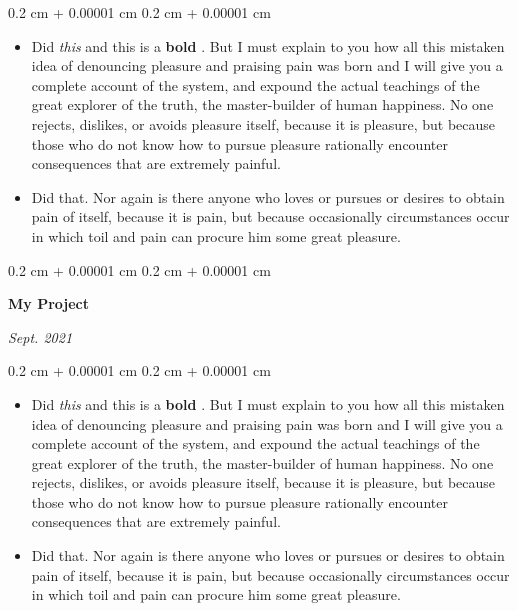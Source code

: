 \documentclass[10pt, letterpaper]{article}
\newenvironment{highlights}{
    \begin{itemize}[
        topsep=0.10 cm,
        parsep=0.10 cm,
        partopsep=0pt,
        itemsep=0pt,
        leftmargin=0.4 cm + 10pt
    ]
}{
    \end{itemize}
} %
\newenvironment{onecolentry}{
    \begin{adjustwidth}{
        0.2 cm + 0.00001 cm
    }{
        0.2 cm + 0.00001 cm
    }
}{
    \end{adjustwidth}
} %
\newenvironment{twocolentry}[2][]{
    \onecolentry
    \def\secondColumn{#2}
    \setcolumnwidth{\fill, 4.5 cm}
    \begin{paracol}{2}
}{
    \switchcolumn \raggedleft \secondColumn
    \end{paracol}
    \endonecolentry
} %
\let\hrefWithoutArrow\href
\renewcommand{\href}[2]{\hrefWithoutArrow{#1}{\mbox{\ifthenelse{\equal{#2}{}}{ }{#2 }\raisebox{.15ex}{\footnotesize \faExternalLink*}}}}
\begin{document}
        \vspace{0.10 cm-3px}
        \begin{onecolentry}
            \begin{highlights}
                \item Did \textit{this} and this is a \textbf{bold} \href{https://example.com}{link}. But I must explain to you how all this mistaken idea of denouncing pleasure and praising pain was born and I will give you a complete account of the system, and expound the actual teachings of the great explorer of the truth, the master-builder of human happiness. No one rejects, dislikes, or avoids pleasure itself, because it is pleasure, but because those who do not know how to pursue pleasure rationally encounter consequences that are extremely painful.
                \item Did that. Nor again is there anyone who loves or pursues or desires to obtain pain of itself, because it is pain, but because occasionally circumstances occur in which toil and pain can procure him some great pleasure.
            \end{highlights}
        \end{onecolentry}


        \vspace{0.2 cm-3px}

        \begin{twocolentry}{
            
            
        \textit{Sept. 2021}}
            \textbf{My Project}
        \end{twocolentry}

        \vspace{0.10 cm-3px}
        \begin{onecolentry}
            \begin{highlights}
                \item Did \textit{this} and this is a \textbf{bold} \href{https://example.com}{link}. But I must explain to you how all this mistaken idea of denouncing pleasure and praising pain was born and I will give you a complete account of the system, and expound the actual teachings of the great explorer of the truth, the master-builder of human happiness. No one rejects, dislikes, or avoids pleasure itself, because it is pleasure, but because those who do not know how to pursue pleasure rationally encounter consequences that are extremely painful.
                \item Did that. Nor again is there anyone who loves or pursues or desires to obtain pain of itself, because it is pain, but because occasionally circumstances occur in which toil and pain can procure him some great pleasure.
            \end{highlights}
        \end{onecolentry}
\end{document}
